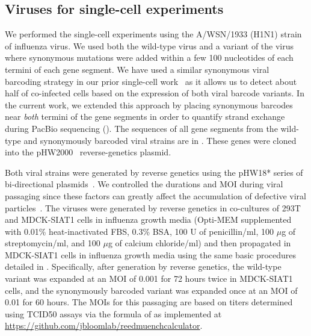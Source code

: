 \documentclass[9pt,lineno]{elife}
\begin{document}
\subsection{Viruses for single-cell experiments}
We performed the single-cell experiments using the A/WSN/1933 (H1N1) strain of influenza virus.
We used both the wild-type virus and a variant of the virus where synonymous mutations were added within a few 100 nucleotides of each termini of each gene segment.
We have used a similar synonymous viral barcoding strategy in our prior single-cell work~\citep{russell2018extreme} as it allows us to detect about half of co-infected cells based on the expression of both viral barcode variants.
In the current work, we extended this approach by placing synonymous barcodes near \emph{both} termini of the gene segments in order to quantify strand exchange during PacBio sequencing ().
The sequences of all gene segments from the wild-type and synonymously barcoded viral strains are in .
These genes were cloned into the pHW2000~\citep{hoffmann2000dna} reverse-genetics plasmid.

Both viral strains were generated by reverse genetics using the pHW18* series of bi-directional plasmids~\citep{hoffmann2000dna}.
We controlled the durations and MOI during viral passaging since these factors can greatly affect the accumulation of defective viral particles~\citep{xue2016propagation}.
The viruses were generated by reverse genetics in co-cultures of 293T and MDCK-SIAT1 cells in influenza growth media (Opti-MEM supplemented with 0.01\% heat-inactivated FBS, 0.3\% BSA, 100 U of penicillin/ml, 100 $\mu$g of streptomycin/ml, and 100 $\mu$g of calcium chloride/ml) and then propagated in MDCK-SIAT1 cells in influenza growth media using the same basic procedures detailed in \citet{russell2018extreme}.
Specifically, after generation by reverse genetics, the wild-type variant was expanded at an MOI of 0.001 for 72 hours twice in MDCK-SIAT1 cells, and the synonymously barcoded variant was expanded once at an MOI of 0.01 for 60 hours.
The MOIs for this passaging are based on titers determined using TCID50 assays via the formula of \citet{reed1938simple} as implemented at \url{https://github.com/jbloomlab/reedmuenchcalculator}.
\end{document}
